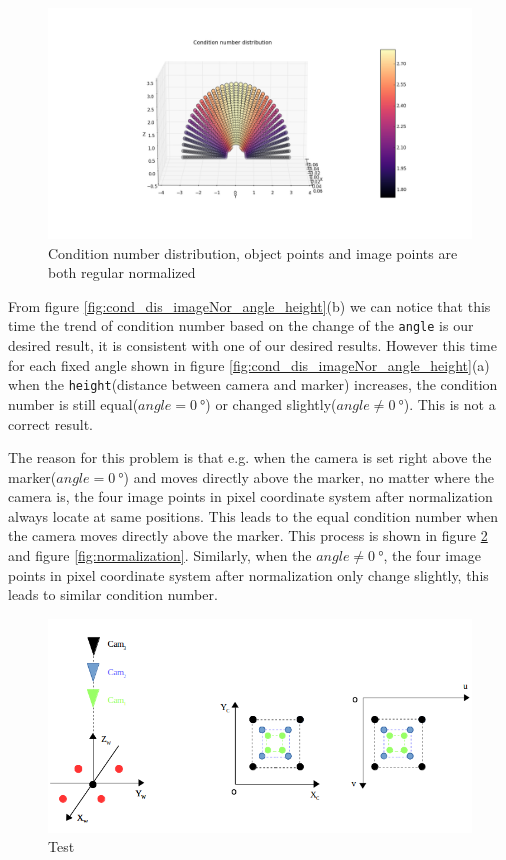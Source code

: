 \begin{figure}[H]
\hspace*{-4cm}
\centering
\includegraphics[scale=0.6]{./fig/cond_dis_imageNor.png}
\caption{Condition number distribution, object points and image points are both regular normalized}  
\label{fig:cond_dis_imageNor}
\end{figure}

From figure \ref{fig:cond_dis_imageNor_angle_height}(b) we can notice that this time the trend of condition number based on the change of the \texttt{angle} is our desired result, it is consistent with one of our desired results. However this time for each fixed angle shown in figure \ref{fig:cond_dis_imageNor_angle_height}(a) when the \texttt{height}(distance between camera and marker) increases, the condition number is still equal($angle = \SI{0}{\degree}$) or changed slightly($angle \neq \SI{0}{\degree}$). This is not a correct result.

The reason for this problem is that e.g. when the camera is set right above the marker($angle = \SI{0}{\degree}$) and moves directly above the marker, no matter where the camera is, the four image points in pixel coordinate system after normalization always locate at same positions. This leads to the equal condition number when the camera moves directly above the marker. This process is shown in figure \ref{fig:cam123} and figure \ref{fig:normalization}. Similarly, when the $angle \neq \SI{0}{\degree}$, the four image points in pixel coordinate system after normalization only change slightly, this leads to similar condition number.


\begin{figure}[H]
\centering
\includegraphics[scale=0.8]{./fig/cam123.png}
\caption{Test}  
\label{fig:cam123}
\end{figure}

